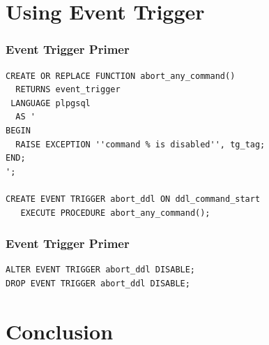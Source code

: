 \documentclass{beamer}
\begin{document}
\section{Using Event Trigger}

\begin{frame}[fragile]
  \frametitle{Event Trigger Primer}

\begin{verbatim}
CREATE OR REPLACE FUNCTION abort_any_command()
  RETURNS event_trigger
 LANGUAGE plpgsql
  AS '
BEGIN
  RAISE EXCEPTION ''command % is disabled'', tg_tag;
END;
';

CREATE EVENT TRIGGER abort_ddl ON ddl_command_start
   EXECUTE PROCEDURE abort_any_command();
\end{verbatim}
\end{frame}

\begin{frame}[fragile]
  \frametitle{Event Trigger Primer}

\begin{verbatim}
ALTER EVENT TRIGGER abort_ddl DISABLE;
DROP EVENT TRIGGER abort_ddl DISABLE;
\end{verbatim}
\end{frame}



\section{Conclusion}

\end{document}
